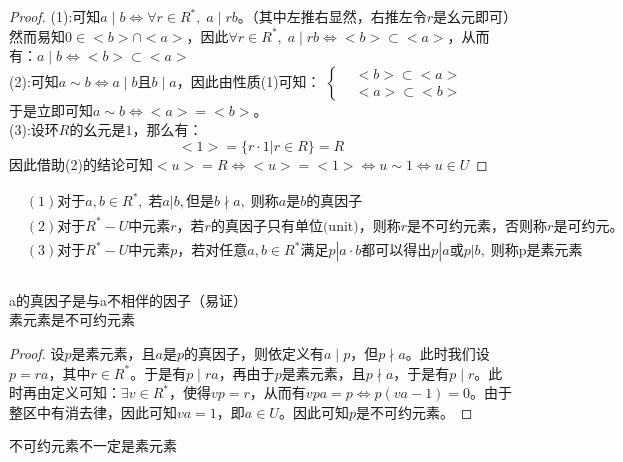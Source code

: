 \begin{proof}
(1):可知$a\mid b\iff \forall r\in R^*,\; a\mid rb$。（其中左推右显然，右推左令$r$是幺元即可）然而易知$0\in<b>\cap<a>$，因此$\forall r\in R^*,\; a\mid rb\iff <b>\subset<a>$，从而有：$a\mid b\iff <b>\subset<a>$\\
\indent (2):可知$a\sim b\iff a\mid b\text{且} b\mid a$，因此由性质(1)可知：
$\left\{
\begin{aligned}
&<b>\subset<a>\\
&<a>\subset<b>
\end{aligned}\right.$
\\
于是立即可知$a\sim b\iff <a>=<b>$。\\
\indent (3):设环$R$的幺元是$1$，那么有：
\[
<1>=\{r\cdot 1|r\in R\}=R
\]
因此借助(2)的结论可知$<u>=R\iff <u>=<1>\iff u\sim 1\iff u\in U$
\end{proof}
\[
\begin{aligned}
&(1)\text{对于}a,b\in R^*,\; \text{若}a|b,\text{但是}b\nmid a,\; \text{则称}a\text{是}b\text{的真因子}\\
&(2)\text{对于}R^*-U\text{中元素$r$，若$r$的真因子只有单位(unit)，则称$r$是不可约元素，否则称$r$是可约元。}\\
&(3)\text{对于}R^*-U\text{中元素$p$，若对任意}a,b\in R^*\text{满足}p|a\cdot b\text{都可以得出}p|a\text{或}p|b,\; \text{则称p是素元素}\\
\end{aligned}
\]
\\
a的真因子是与a不相伴的因子（易证）\\
素元素是不可约元素
\begin{proof}
\indent 设$p$是素元素，且$a$是$p$的真因子，则依定义有$a\mid p$，但$p\nmid a$。此时我们设$p=ra$，其中$r\in R^*$。于是有$p\mid ra$，再由于$p$是素元素，且$p\nmid a$，于是有$p\mid r$。此时再由定义可知：$\exists v\in R^*$，使得$vp=r$，从而有$vpa=p\iff p(va-1)=0$。由于整区中有消去律，因此可知$va=1$，即$a\in U$。因此可知$p$是不可约元素。
\end{proof}
不可约元素不一定是素元素
